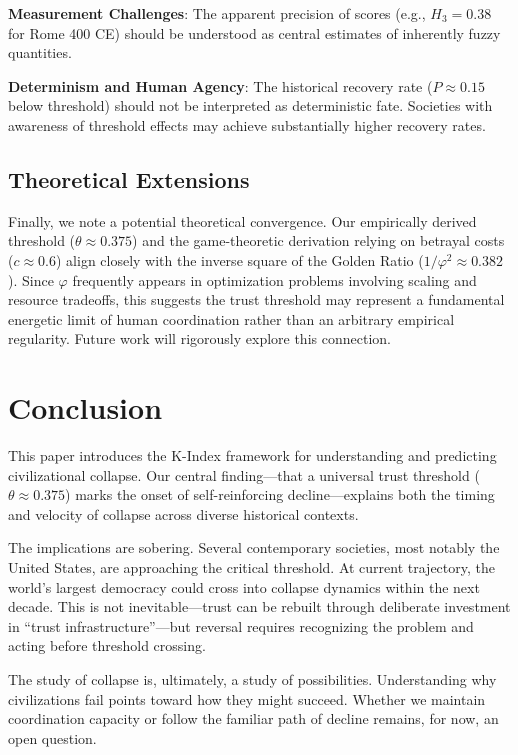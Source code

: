 \documentclass[11pt,a4paper]{article}
\newcommand{\Hthree}{H_3}
\begin{document}
\textbf{Measurement Challenges}: The apparent precision of scores (e.g., $\Hthree = 0.38$ for Rome 400 CE) should be understood as central estimates of inherently fuzzy quantities.

\textbf{Determinism and Human Agency}: The historical recovery rate ($P \approx 0.15$ below threshold) should not be interpreted as deterministic fate. Societies with awareness of threshold effects may achieve substantially higher recovery rates.

\subsection{Theoretical Extensions}

Finally, we note a potential theoretical convergence. Our empirically derived threshold ($\theta \approx 0.375$) and the game-theoretic derivation relying on betrayal costs ($c \approx 0.6$) align closely with the inverse square of the Golden Ratio ($1/\varphi^2 \approx 0.382$). Since $\varphi$ frequently appears in optimization problems involving scaling and resource tradeoffs, this suggests the trust threshold may represent a fundamental energetic limit of human coordination rather than an arbitrary empirical regularity. Future work will rigorously explore this connection.

\section{Conclusion}

This paper introduces the K-Index framework for understanding and predicting civilizational collapse. Our central finding---that a universal trust threshold ($\theta \approx 0.375$) marks the onset of self-reinforcing decline---explains both the timing and velocity of collapse across diverse historical contexts.

The implications are sobering. Several contemporary societies, most notably the United States, are approaching the critical threshold. At current trajectory, the world's largest democracy could cross into collapse dynamics within the next decade. This is not inevitable---trust can be rebuilt through deliberate investment in ``trust infrastructure''---but reversal requires recognizing the problem and acting before threshold crossing.

The study of collapse is, ultimately, a study of possibilities. Understanding why civilizations fail points toward how they might succeed. Whether we maintain coordination capacity or follow the familiar path of decline remains, for now, an open question.
\end{document}
